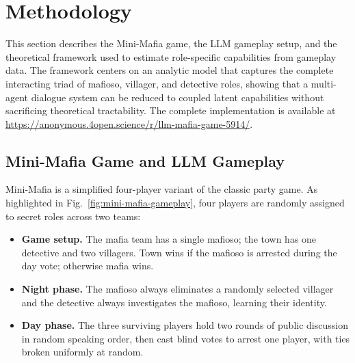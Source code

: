 \documentclass[sigconf]{aamas}
\begin{document}
\section{Methodology}
\label{sec:methodology}

This section describes the Mini-Mafia game, the LLM gameplay setup, and the theoretical framework used to estimate role-specific capabilities from gameplay data. The framework centers on an analytic model that captures the complete interacting triad of mafioso, villager, and detective roles, showing that a multi-agent dialogue system can be reduced to coupled latent capabilities without sacrificing theoretical tractability. The complete implementation is available at \url{https://anonymous.4open.science/r/llm-mafia-game-5914/}.


\subsection{Mini-Mafia Game and LLM Gameplay}
\label{sec:mini_mafia_gameplay}

Mini-Mafia is a simplified four-player variant of the classic party game. As highlighted in Fig.~\ref{fig:mini-mafia-gameplay}, four players are randomly assigned to secret roles across two teams:
\begin{itemize}
    \item \textbf{Game setup.} The mafia team has a single mafioso; the town has one detective and two villagers. Town wins if the mafioso is arrested during the day vote; otherwise mafia wins.

    \item \textbf{Night phase.} The mafioso always eliminates a randomly selected villager and the detective always investigates the mafioso, learning their identity.

    \item \textbf{Day phase.} The three surviving players hold two rounds of public discussion in random speaking order, then cast blind votes to arrest one player, with ties broken uniformly at random.
\end{itemize}
\end{document}
